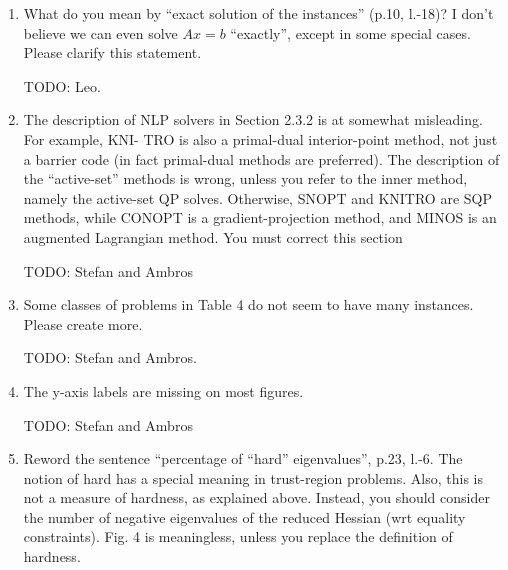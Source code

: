 \documentclass[11pt]{article}
\newcommand{\rep}[1]{{\textcolor{acblue}{#1}}}
\newcommand{\leo}[1]{{\color{red}#1}}
\begin{document}
{\begin{enumerate}
\item What do you mean by ``exact solution of the instances'' (p.10, l.-18)? I don't believe we can even
solve $Ax = b$ ``exactly'', except in some special cases. Please clarify this statement.

\rep{TODO: Leo. 
}


\item The description of NLP solvers in Section 2.3.2 is at somewhat misleading. For example, KNI-
TRO is also a primal-dual interior-point method, not just a barrier code (in fact primal-dual
methods are preferred). The description of the “active-set” methods is wrong, unless you refer
to the inner method, namely the active-set QP solves. Otherwise, SNOPT and KNITRO are
SQP methods, while CONOPT is a gradient-projection method, and MINOS is an augmented
Lagrangian method. You must correct this section

\rep{TODO: Stefan and Ambros
}


\item Some classes of problems in Table 4 do not seem to have many instances. Please create more.

\rep{
TODO: Stefan and Ambros.
}


\item The y-axis labels are missing on most figures.

\rep{
TODO: Stefan and Ambros
}


\item Reword the sentence ``percentage of ``hard'' eigenvalues'', p.23, l.-6. The notion of hard has a
special meaning in trust-region problems. Also, this is not a measure of hardness, as explained
above. Instead, you should consider the number of negative eigenvalues of the reduced Hessian
(wrt equality constraints). Fig. 4 is meaningless, unless you replace the definition of hardness.


\end{enumerate}}
\end{document}
